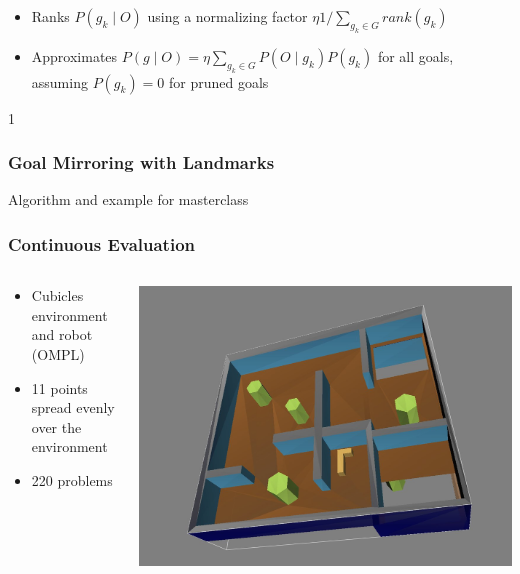 \documentclass{beamer}
\newcommand{\todo}[1]{ {\color{red} #1} }
\def\masterclass{1}
\begin{document}
\begin{frame}[c]
\begin{columns}
\begin{column}{0.3\textwidth}
			\end{column}
		\end{columns}
		\begin{itemize}
			\item Ranks $P(g_k \mid O)$ using a normalizing factor $\eta 1/\sum_{g_k \in G} rank(g_k)$
			\item Approximates $P(g \mid O) = \eta \sum_{g_k \in G} P(O \mid g_k) P(g_k)$ for all goals, assuming $P(g_k) = 0$ for pruned goals 
		\end{itemize}
	\end{frame}
	
	\if\masterclass1
	\begin{frame}[c]\frametitle{Goal Mirroring with Landmarks}
		\todo{Algorithm and example for masterclass}
	\end{frame}
	\fi
	
	\begin{frame}[c]\frametitle{Continuous Evaluation}
		\begin{columns}
			\begin{column}{0.7\textwidth}
				\begin{itemize}
					\item Cubicles environment and robot (OMPL)
					\item 11 points spread evenly over the environment
					\item 220 problems
				\end{itemize}
		\end{column}
		\begin{column}{0.3\textwidth}
			\includegraphics[width=\textwidth]{fig/CubiclesEnv_RobotOnlyView.png}
		\end{column}
		\end{columns}
	\end{frame}
\end{document}
